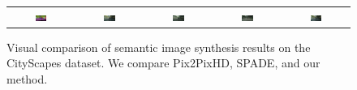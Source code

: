 \begin{figure}[]
\begin{tabular} {cc|cc|c}
\includegraphics[width=0.1932\textwidth]{Images/Rec/CityScape/label/frankfurt_000001_044787_leftImg8bit.png} & \includegraphics[width=0.1932\textwidth]{Images/Rec/CityScape/gt/frankfurt_000001_044787_leftImg8bit.jpg} &
\includegraphics[width=0.1932\textwidth]{Images/Rec/CityScape/pix2pixhd/frankfurt_000001_044787_leftImg8bit.jpg} &   \includegraphics[width=0.1932\textwidth]{Images/Rec/CityScape/spade/frankfurt_000001_044787_leftImg8bit.jpg} &  \includegraphics[width=0.1932\textwidth]{Images/Rec/CityScape/ours/frankfurt_000001_044787_leftImg8bit.png} \\


\end{tabular}
\vspace{-2mm}
	\caption{Visual  comparison  of  semantic  image  synthesis  results  on  the  CityScapes dataset. We compare Pix2PixHD, SPADE, and our method.}
	\label{fig:CityScape results}	
\vspace{-3mm}	
 \end{figure}
 \egroup
 \addtolength{\tabcolsep}{4.5pt}